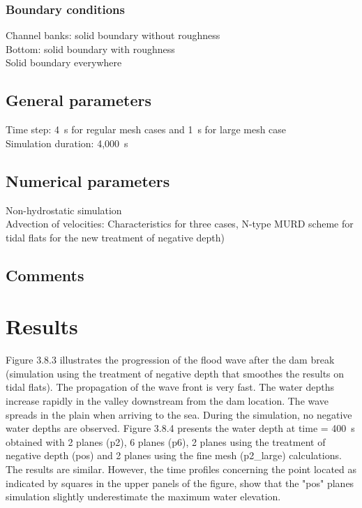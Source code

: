\subsubsection{Boundary conditions}
%
Channel banks: solid boundary without roughness\\
Bottom: solid boundary with roughness\\
Solid boundary everywhere
%
\subsection{General parameters}
%
Time step: 4~s for regular mesh cases and 1~s for large mesh case\\
Simulation duration: 4,000~s
%
%
%
\subsection{Numerical parameters}
%
Non-hydrostatic simulation\\
Advection of velocities: Characteristics for three cases, N-type MURD
scheme for tidal flats for the new treatment of negative depth)
%
\subsection{Comments}
%
%
%
\section{Results}
%
Figure 3.8.3 illustrates the progression of the flood wave after the dam
break (simulation using the treatment of negative depth that smoothes
the results on tidal flats).
The propagation of the wave front is very fast.
The water depths increase rapidly in the valley downstream from the dam
location.
The wave spreads in the plain when arriving to the sea.
During the simulation, no negative water depths are observed.
Figure 3.8.4 presents the water depth at time = 400~s obtained with 2
planes (p2), 6 planes (p6), 2 planes using the treatment of negative
depth (pos) and 2 planes using the fine mesh (p2\_large) calculations.
The results are similar.
However, the time profiles concerning the point located as indicated by
squares in the upper panels of the figure, show that the "pos"
planes simulation slightly underestimate the maximum water elevation.
%
